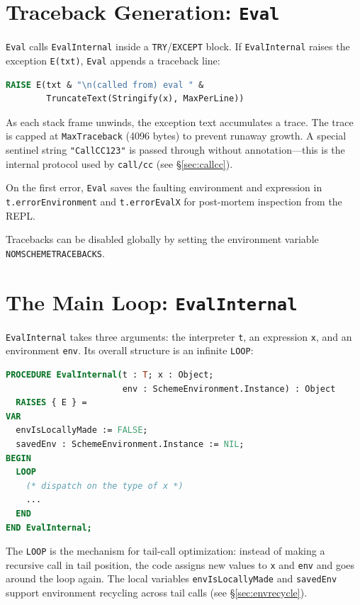 \documentclass[12pt]{report}
\begin{document}
\section{Traceback Generation: \texttt{Eval}}

\texttt{Eval} calls \texttt{EvalInternal} inside a \texttt{TRY}/\texttt{EXCEPT}
block.  If \texttt{EvalInternal} raises the exception \texttt{E(txt)},
\texttt{Eval} appends a traceback line:

\begin{lstlisting}[language=Modula3]
RAISE E(txt & "\n(called from) eval " &
        TruncateText(Stringify(x), MaxPerLine))
\end{lstlisting}

As each stack frame unwinds, the exception text accumulates a trace.
The trace is capped at \texttt{MaxTraceback} (4096 bytes) to prevent
runaway growth.  A special sentinel string \texttt{"CallCC123"} is passed
through without annotation---this is the internal protocol used by
\texttt{call/cc} (see \S\ref{sec:callcc}).

On the first error, \texttt{Eval} saves the faulting environment and
expression in \texttt{t.errorEnvironment} and \texttt{t.errorEvalX} for
post-mortem inspection from the REPL.

Tracebacks can be disabled globally by setting the environment variable
\texttt{NOMSCHEMETRACEBACKS}.

\section{The Main Loop: \texttt{EvalInternal}}
\label{sec:evalinternal}

\texttt{EvalInternal} takes three arguments: the interpreter \texttt{t},
an expression \texttt{x}, and an environment \texttt{env}.  Its overall
structure is an infinite \texttt{LOOP}:

\begin{lstlisting}[language=Modula3]
PROCEDURE EvalInternal(t : T; x : Object;
                       env : SchemeEnvironment.Instance) : Object
  RAISES { E } =
VAR
  envIsLocallyMade := FALSE;
  savedEnv : SchemeEnvironment.Instance := NIL;
BEGIN
  LOOP
    (* dispatch on the type of x *)
    ...
  END
END EvalInternal;
\end{lstlisting}

The \texttt{LOOP} is the mechanism for tail-call optimization: instead of
making a recursive call in tail position, the code assigns new values to
\texttt{x} and \texttt{env} and goes around the loop again.  The local
variables \texttt{envIsLocallyMade} and \texttt{savedEnv} support
environment recycling across tail calls (see \S\ref{sec:envrecycle}).
\end{document}
